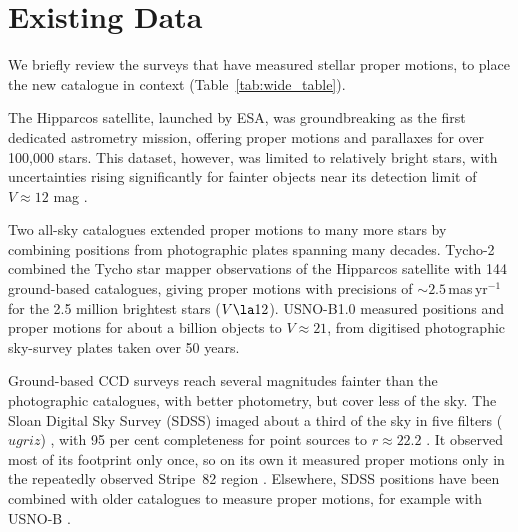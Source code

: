\documentclass[usenatbib]{mnras}   %
\begin{document}

\section{Existing Data} \label{sec:existing}
We briefly review the surveys that have measured stellar proper motions, to place the new catalogue in context (Table~\ref{tab:wide_table}).

The Hipparcos satellite, launched by ESA, was groundbreaking as the first dedicated astrometry mission, offering proper motions and parallaxes for over 100,000 stars. This dataset, however, was limited to relatively bright stars, with uncertainties rising significantly for fainter objects near its detection limit of \( V \approx 12 \) mag \citep{HIPPARCOS_1997}. %

Two all-sky catalogues extended proper motions to many more stars by combining positions from photographic plates spanning many decades. Tycho-2 \citep{Hog2000} combined the Tycho star mapper observations of the Hipparcos satellite with 144 ground-based catalogues, giving proper motions with precisions of $\sim\!2.5$\,mas\,yr$^{-1}$ for the 2.5 million brightest stars ($V \la 12$). USNO-B1.0 \citep{Monet2003} measured positions and proper motions for about a billion objects to $V \approx 21$, from digitised photographic sky-survey plates taken over 50 years.

Ground-based CCD surveys reach several magnitudes fainter than the photographic catalogues, with better photometry, but cover less of the sky. The Sloan Digital Sky Survey (SDSS) imaged about a third of the sky in five filters ($ugriz$) \citep{SDSS_2000}, with 95 per cent completeness for point sources to $r \approx 22.2$ \citep{Abazajian2009}. It observed most of its footprint only once, so on its own it measured proper motions only in the repeatedly observed Stripe~82 region \citep{Bramich_2008}. Elsewhere, SDSS positions have been combined with older catalogues to measure proper motions, for example with USNO-B \citep{Munn2004}.
\end{document}
